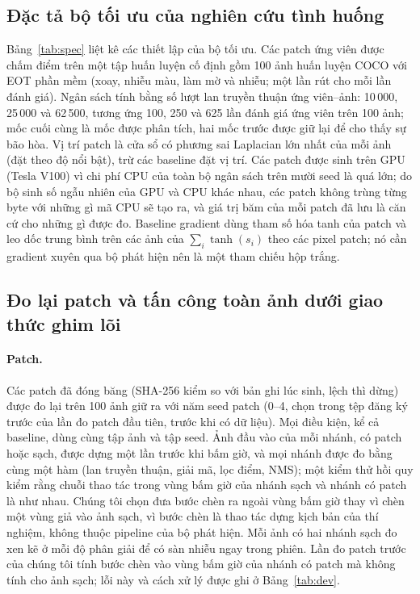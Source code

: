 \documentclass[12pt,a4paper]{article}
\begin{document}
\subsection{Đặc tả bộ tối ưu của nghiên cứu tình huống}
Bảng~\ref{tab:spec} liệt kê các thiết lập của bộ tối ưu. Các patch ứng viên được chấm điểm trên một tập huấn luyện cố định gồm 100 ảnh huấn luyện COCO \cite{lin2014coco} với EOT phần mềm (xoay, nhiễu màu, làm mờ và nhiễu; một lần rút cho mỗi lần đánh giá). Ngân sách tính bằng số lượt lan truyền thuận ứng viên--ảnh: 10\,000, 25\,000 và 62\,500, tương ứng 100, 250 và 625 lần đánh giá ứng viên trên 100 ảnh; mốc cuối cùng là mốc được phân tích, hai mốc trước được giữ lại để cho thấy sự bão hòa. Vị trí patch là cửa sổ có phương sai Laplacian lớn nhất của mỗi ảnh (đặt theo độ nổi bật), trừ các baseline đặt vị trí. Các patch được sinh trên GPU (Tesla V100) vì chi phí CPU của toàn bộ ngân sách trên mười seed là quá lớn; do bộ sinh số ngẫu nhiên của GPU và CPU khác nhau, các patch không trùng từng byte với những gì mã CPU sẽ tạo ra, và giá trị băm của mỗi patch đã lưu là căn cứ cho những gì được đo. Baseline gradient dùng tham số hóa tanh của patch và leo dốc trung bình trên các ảnh của $\sum_i \tanh(s_i)$ theo các pixel patch; nó cần gradient xuyên qua bộ phát hiện nên là một tham chiếu hộp trắng.



\subsection{Đo lại patch và tấn công toàn ảnh dưới giao thức ghim lõi}
\label{sec:attackdesign}
\paragraph{Patch.} Các patch đã đóng băng (SHA-256 kiểm so với bản ghi lúc sinh, lệch thì dừng) được đo lại trên 100 ảnh giữ ra với năm seed patch (0--4, chọn trong tệp đăng ký trước của lần đo patch đầu tiên, trước khi có dữ liệu). Mọi điều kiện, kể cả baseline, dùng cùng tập ảnh và tập seed. Ảnh đầu vào của mỗi nhánh, có patch hoặc sạch, được dựng một lần trước khi bấm giờ, và mọi nhánh được đo bằng cùng một hàm (lan truyền thuận, giải mã, lọc điểm, NMS); một kiểm thử hồi quy kiểm rằng chuỗi thao tác trong vùng bấm giờ của nhánh sạch và nhánh có patch là như nhau. Chúng tôi chọn đưa bước chèn ra ngoài vùng bấm giờ thay vì chèn một vùng giả vào ảnh sạch, vì bước chèn là thao tác dựng kịch bản của thí nghiệm, không thuộc pipeline của bộ phát hiện. Mỗi ảnh có hai nhánh sạch đo xen kẽ ở mỗi độ phân giải để có sàn nhiễu ngay trong phiên. Lần đo patch trước của chúng tôi tính bước chèn vào vùng bấm giờ của nhánh có patch mà không tính cho ảnh sạch; lỗi này và cách xử lý được ghi ở Bảng~\ref{tab:dev}.
\end{document}
